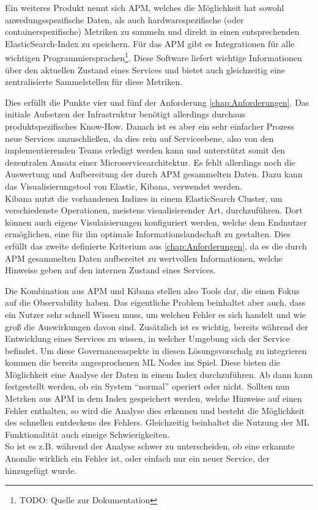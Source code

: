 \documentclass[
	12pt,
	BCOR=5mm,
	DIV=12,
	headinclude=on,
	footinclude=off,
	parskip=half,
	bibliography=totoc,
	listof=entryprefix,
	toc=listof,
	numbers=noenddot,
	plainfootsepline
]{scrreprt}
\begin{document}
Ein weiteres Produkt nennt sich \ac{APM}, welches die Möglichkeit hat sowohl anwedungsspezifische Daten, als auch hardwarespezifische (oder containerspezifische) Metriken zu sammeln und direkt in einen entsprechenden ElasticSearch-Index zu speichern. Für das \ac{APM} gibt es Integrationen für alle wichtigen Programmiersprachen\footnote{TODO: Quelle zur Dokumentation}. Diese Software liefert wichtige Informationen über den aktuellen Zustand eines Services und bietet auch gleichzeitig eine zentralisierte Sammelstellen für diese Metriken. 

Dies erfüllt die Punkte vier und fünf der Anforderung \vref{chap:Anforderungen}. Das initiale Aufsetzen der Infrastruktur benötigt allerdings durchaus produktspezifisches Know-How. Danach ist es aber ein sehr einfacher Prozess neue Services anzuschließen, da dies rein auf Serviceebene, also von den implementierenden Teams erledigt werden kann und unterstützt somit den dezentralen Ansatz einer Microservicearchitektur. Es fehlt allerdings noch die Auswertung und Aufbereitung der durch \ac{APM} gesammelten Daten. Dazu kann das Visualisierungstool von Elastic, Kibana, verwendet werden. \\
Kibana nutzt die vorhandenen Indizes in einem ElasticSearch Cluster, um verschiedenste Operationen, meistens visualisierender Art, durchzuführen. Dort können auch eigene Visulaisierungen konfiguriert werden, welche dem Endnutzer ermöglichen, eine für ihn optimale Informationslandschaft zu gestalten. Dies erfüllt das zweite definierte Kriterium aus \vref{chap:Anforderungen}, da es die durch \ac{APM} gesammelten Daten aufbereitet zu wertvollen Informationen, welche Hinweise geben auf den internen Zustand eines Services.

Die Kombination aus \ac{APM} und Kibana stellen also Tools dar, die einen Fokus auf die Observability haben. Das eigentliche Problem beinhaltet aber auch, dass ein Nutzer sehr schnell Wissen muss, um welchen Fehler es sich handelt und wie groß die Auswirkungen davon sind. Zusätzlich ist es wichtig, bereits während der Entwicklung eines Services zu wissen, in welcher Umgebung sich der Service befindet. Um diese Governanceaspekte in diesen Lösungsvorschalg zu integrieren kommen die bereits angesprochenen \ac{ML} Nodes ins Spiel. Diese bieten die Möglichkeit eine Analyse der Daten in einem Index durchzuführen. Ab dann kann festgestellt werden, ob ein System \enquote{normal} operiert oder nicht. Sollten nun Metrken aus \ac{APM} in dem Index gespeichert werden, welche Hinweise auf einen Fehler enthalten, so wird die Analyse dies erkennen und besteht die Möglichkeit des schnellen entdeckens des Fehlers. Gleichzeitig beinhaltet die Nutzung der \ac{ML} Funktionalität auch eineige Schwierigkeiten. \\
So ist es z.B. während der Analyse schwer zu unterscheiden, ob eine erkannte Anomlie wirklich ein Fehler ist, oder einfach nur ein neuer Service, der hinzugefügt wurde.
\end{document}
